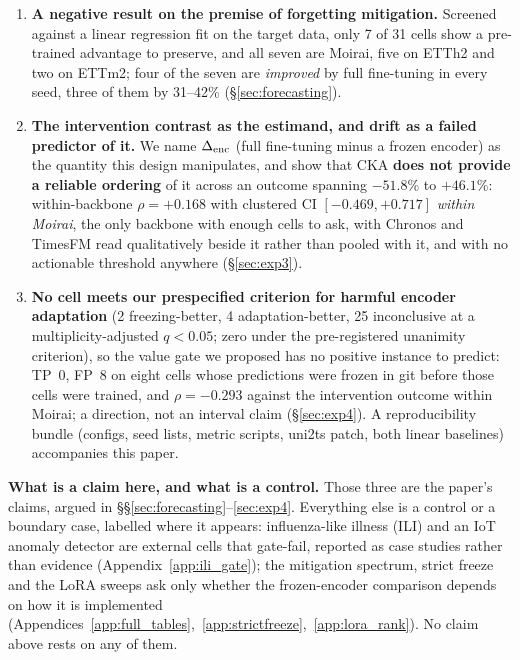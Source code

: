\begin{enumerate}\itemsep1pt
  \item \textbf{A negative result on the premise of forgetting mitigation.}
    Screened against a linear regression fit on the target data, only 7 of 31
    cells show a pre-trained advantage to preserve, and all seven are Moirai,
    five on ETTh2 and two on ETTm2; four of the seven are \emph{improved} by full
    fine-tuning in every seed, three of them by 31--42\% (\S\ref{sec:forecasting}).

  \item \textbf{The intervention contrast as the estimand, and drift as a failed
    predictor of it.}  We name $\Delta_\text{enc}$ (full fine-tuning minus a frozen
    encoder) as the quantity this design manipulates, and show that CKA
    \textbf{does not provide a reliable ordering} of it across an outcome spanning
    $-51.8\%$ to $+46.1\%$: within-backbone $\rho{=}{+}0.168$ with clustered CI
    $[-0.469,{+}0.717]$ \emph{within Moirai}, the only backbone with enough cells to
    ask, with Chronos and TimesFM read qualitatively beside it rather than pooled
    with it, and with no actionable threshold anywhere (\S\ref{sec:exp3}).

  \item \textbf{No cell meets our prespecified criterion for harmful encoder adaptation}
    (2 freezing-better, 4 adaptation-better, 25 inconclusive at a
    multiplicity-adjusted $q{<}0.05$; zero under the pre-registered unanimity
    criterion), so the value gate we proposed has no positive instance to
    predict: TP~0, FP~8 on
    eight cells whose predictions were frozen in git before those cells were
    trained, and $\rho{=}{-}0.293$ against the intervention outcome within
    Moirai; a direction, not an interval claim (\S\ref{sec:exp4}).  A
    reproducibility bundle (configs, seed lists, metric scripts, uni2ts patch,
    both linear baselines) accompanies this paper.
\end{enumerate}

\textbf{What is a claim here, and what is a control.}  Those three are the paper's
claims, argued in \S\S\ref{sec:forecasting}--\ref{sec:exp4}.  Everything else is a
control or a boundary case, labelled where it appears: influenza-like illness
(ILI) and an IoT anomaly detector are external cells that gate-fail, reported as case
studies rather than evidence (Appendix~\ref{app:ili_gate}); the mitigation spectrum,
strict freeze and the LoRA sweeps ask only whether the frozen-encoder comparison
depends on how it is implemented
(Appendices~\ref{app:full_tables},~\ref{app:strictfreeze},~\ref{app:lora_rank}).
No claim above rests on any of them.
